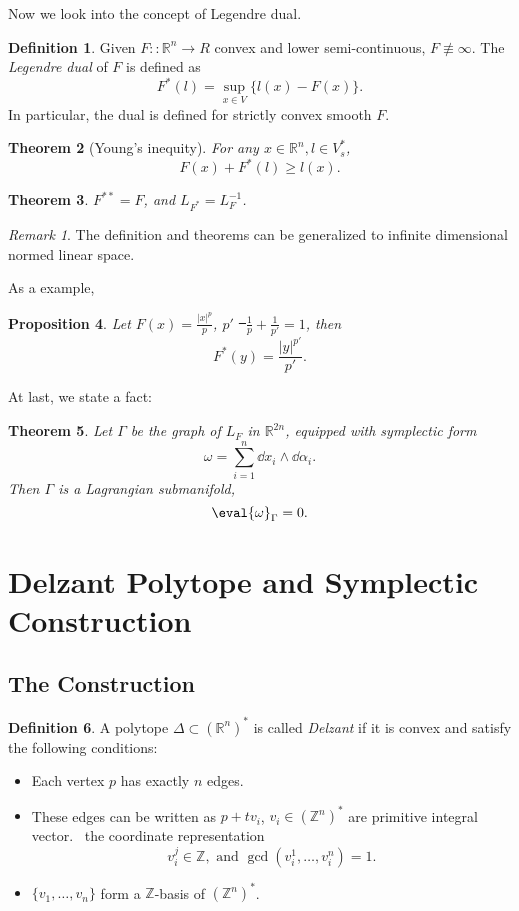 \documentclass[12pt]{article}
\theoremstyle{plain}\newtheorem{theorem}{Theorem}
\theoremstyle{definition}\newtheorem{definition}[theorem]{Definition}
\theoremstyle{definition}\newtheorem{example}[theorem]{Example}
\theoremstyle{plain}\newtheorem{axiom}[theorem]{Axiom}
\theoremstyle{plain}\newtheorem{assertion}[theorem]{Assertion}
\theoremstyle{plain}\newtheorem{corollary}[theorem]{Corollary}
\theoremstyle{plain}\newtheorem{lemma}[theorem]{Lemma}
\theoremstyle{plain}\newtheorem{proposition}[theorem]{Proposition}
\theoremstyle{plain}\newtheorem{prop}[theorem]{Proposition}
\theoremstyle{plain}\newtheorem{conjecture}[theorem]{Conjecture}
\theoremstyle{plain}\newtheorem{conj}[theorem]{Conjecture}
\theoremstyle{plain}\newtheorem{problem}[theorem]{Problem}
\theoremstyle{remark}\newtheorem{notation}[theorem]{Notation}
\theoremstyle{definition}\newtheorem*{question}{Question}
\theoremstyle{definition}\newtheorem*{answer}{Answer}
\theoremstyle{definition}\newtheorem*{goal}{Goal}
\theoremstyle{plain}\newtheorem*{application}{Application}
\theoremstyle{plain}\newtheorem*{exercise}{Exercise}
\theoremstyle{remark}\newtheorem*{remark}{Remark}
\theoremstyle{remark}\newtheorem*{note}{\small{Note}}
\numberwithin{equation}{section}
\numberwithin{theorem}{section}
\numberwithin{figure}{section}
\begin{document}
Now we look into the concept of Legendre dual.
\begin{definition}
    Given \(F\colon:\mathbb{R}^n\to R\) convex and lower semi-continuous, \(F
    \not\equiv \infty\).
    The \emph{Legendre dual} of \(F\) is defined as \[
        F^*(l)=\sup_{x\in V}\{l(x)-F(x)\}
    .\] In particular, the dual is defined for strictly convex smooth \(F\).
\end{definition}

\begin{theorem}[Young's inequity]
    For any \(x\in \mathbb{R}^n,l\in V_s^*\), \[
        F(x)+F^*(l)\ge l(x)
    .\] 
\end{theorem}

\begin{theorem}
    \(F^{**}=F\), and \(L_{F^*}=L_F^{-1}\).
\end{theorem}

\begin{remark}
    The definition and theorems can be generalized to infinite dimensional
    normed linear space.
\end{remark}

As a example,
\begin{prop}
    Let \(F(x)=\frac{|x|^p}{p}\), \(p'\) \st\ \(\frac{1}{p}+\frac{1}{p'}=1\), then \[
        F^*(y)=\frac{|y|^{p'}}{p'}
    .\] 
\end{prop}

At last, we state a fact:
\begin{theorem}
    Let \(\Gamma\) be the graph of \(L_F\) in \(\mathbb{R}^{2n}\), equipped with 
    symplectic form \[
        \omega=\sum_{i=1}^n \dd{x_i}\wedge \dd{\alpha_i}
    .\] Then \(\Gamma\) is a Lagrangian submanifold, \ie\ \[
        \eval{\omega}_{\Gamma}=0
    .\] 
\end{theorem}

\section{Delzant Polytope and Symplectic Construction}

\subsection{The Construction}
\begin{definition}
    A polytope \(\Delta\subset (\mathbb{R}^n)^*\) is called \emph{Delzant} if it
    is convex and satisfy the following conditions:
    \begin{itemize}
    \item Each vertex \(p\) has exactly \(n\) edges.
    \item These edges can be written as \(p+tv_i\), \(v_i\in (\mathbb{Z}^n)^*\) are
        primitive integral vector. \ie\ the coordinate representation \[
            v_i^j\in \mathbb{Z},\text{ and }\gcd(v_i^1,\ldots,v_i^n)=1
        .\] 
    \item \(\{v_1,\ldots,v_n\}\) form a \(\mathbb{Z}\)-basis of \((\mathbb{Z}^n)^*\).
    \end{itemize}
\end{definition}
\end{document}
